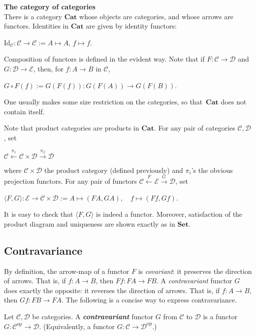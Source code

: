 \documentclass[]{amsbook}
\newcommand{\q}{\quad}
\newcommand{\catname}[1]{\mathbf{#1}}
\newcommand{\0}{\mathbf{0}}
\newcommand{\1}{\mathbf{1}}
\newcommand{\mc}[1]{\mathcal{#1}}
\begin{document}
\textbf{The category of categories}\\
There is a category $\catname{Cat}$ whose objects are categories, and whose
arrows are functors. Identities in $\catname{Cat}$ are given by identity
functors:
\begin{center}
    $\text{Id}_{\mc{C}}: \mc{C} \to \mc{C} := A \mapsto A, \, f \mapsto f$.
\end{center}

Composition of functors is defined in the evident way. Note that if $F: \mc{C}
\to \mc{D}$ and $G: \mc{D} \to \mc{E}$, then, for $f: A \to B$ in $\mc{C}$,
\begin{center}
    $G \circ F (f) := G(F(f)) : G(F(A)) \to G(F(B))$.
\end{center}
One usually makes some size restriction on the categories, so that\
$\catname{Cat}$ does not contain itself.

Note that product categories are products in $\catname{Cat}$. For any pair of
categories $\mc{C}, \mc{D}$, set
\begin{center}
    $\mc{C} \xleftarrow{\pi_1} \mc{C} \times \mc{D} \xrightarrow{\pi_2} \mc{D}$
\end{center}
where $\mc{C} \times \mc{D}$ the product category (defined previously) and
$\pi_i$'s the obvious projection functors. For any pair of functors $\mc{C}
\xleftarrow{F} \mc{E} \xrightarrow{G} \mc{D}$, set
\begin{center}
    $\langle F, G \rangle : \mc{E} \to \mc{C} \times \mc{D} :=
    A \mapsto (FA, GA), \q f \mapsto (Ff, Gf)$.
\end{center}
It is easy to check that $\langle F, G \rangle$ is indeed a functor. Moreover,
satisfaction of the product diagram and uniqueness are shown exactly as in
$\catname{Set}$.
~\\

\subsection*{Contravariance}
By definition, the arrow-map of a functor $F$ is \emph{covariant}: it preserves
the direction of arrows. That is, if $f: A \to B$, then $Ff: FA \to FB$. A
\emph{contravariant} functor $G$ does exactly the opposite: it reverses the
direction of arrows. That is, if $f: A \to B$, then $Gf: FB \to FA$. The
following is a concise way to express contravariance.

Let $\mc{C}, \mc{D}$ be categories. A \emph{\textbf{contravariant}} functor
$G$ from $\mc{C}$ to $\mc{D}$ is a functor $G: \mc{C}^{\text{op}} \to \mc{D}$.
(Equivalently, a functor $G: \mc{C} \to \mc{D}^{\text{op}}$.)
\end{document}
